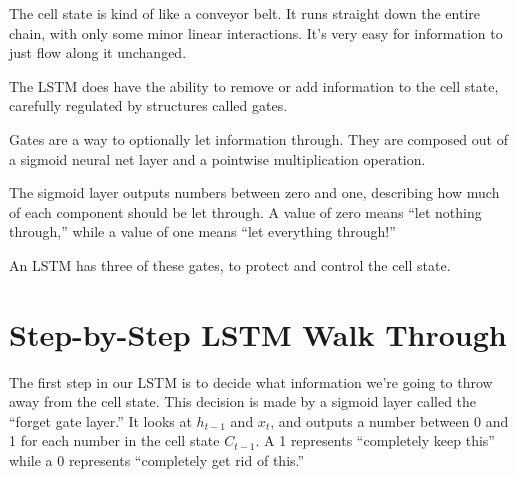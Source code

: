 \documentclass[12pt]{article} %
\begin{document}
The cell state is kind of like a conveyor belt. It runs straight down the entire chain, with only some minor linear interactions. It's very easy for information to just flow along it unchanged.
\begin{figure}[H] %
\label{fig:rnnunrolled}
\end{figure}

The LSTM does have the ability to remove or add information to the cell state, carefully regulated by structures called gates.

Gates are a way to optionally let information through. They are composed out of a sigmoid neural net layer and a pointwise multiplication operation.
\begin{figure}[H] %
\label{fig:rnnunrolled}
\end{figure}

The sigmoid layer outputs numbers between zero and one, describing how much of each component should be let through. A value of zero means ``let nothing through,'' while a value of one means ``let everything through!''

An LSTM has three of these gates, to protect and control the cell state.

\section{Step-by-Step LSTM Walk Through}

The first step in our LSTM is to decide what information we're going to throw away from the cell state. This decision is made by a sigmoid layer called the ``forget gate layer.'' It looks at $h_{t-1}$ and $x_{t}$, and outputs a number between 0 and 1 for each number in the cell state $C_{t-1}$. A 1 represents ``completely keep this'' while a 0 represents ``completely get rid of this.''
\end{document}
